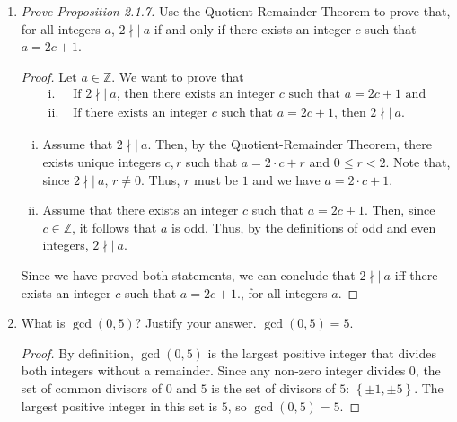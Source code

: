 \documentclass{article}
\begin{document}
\begin{enumerate}
    	\item \emph{Prove Proposition 2.1.7.} Use the Quotient-Remainder Theorem to prove that, for all integers $a$, $2\nmid|\ a$ if and only if there exists an integer $c$ such that $a = 2c + 1$.
                \begin{proof}
                    Let $a\in\mathbb{Z}$. We want to prove that 
                    \begin{align*}
                        \text{i. }   & \text{If $2\nmid|\ a$, then there exists an integer $c$ such that $a = 2c + 1$ and}  \\
                        \text{ii. }  & \text{If there exists an integer $c$ such that $a = 2c + 1$, then $2\nmid|\ a$.}
                    \end{align*}
                                
                    \begin{enumerate}[i.]
                        \item Assume that $2\nmid|\ a$. Then, by the Quotient-Remainder Theorem, there exists unique integers $c,r$ such that $a = 2\cdot c + r$ and $0 \le r < 2$. Note that, since $2\nmid|\ a$, $r \neq 0$. Thus, $r$ must be $1$ and we have $a = 2\cdot c + 1$. \\
                                    
                        \item Assume that there exists an integer $c$ such that $a = 2c + 1$. Then, since $c\in\mathbb{Z}$, it follows that $a$ is odd. Thus, by the definitions of odd and even integers, $2\nmid|\ a$. 
                    \end{enumerate}
                    Since we have proved both statements, we can conclude that $2\nmid|\ a$ iff there exists an integer $c$ such that $a = 2c + 1$., for all integers $a$.
                \end{proof}

    	\item What is $\gcd(0,5)$?  Justify your answer.
                $\gcd(0, 5) = 5$.
                \begin{proof}
                    By definition, $\gcd(0, 5)$ is the largest positive integer that divides both integers without a remainder. Since any non-zero integer divides $0$, the set of common divisors of $0$ and $5$ is the set of divisors of $5$: $\left\{ \pm1, \pm5 \right\}$. The largest positive integer in this set is $5$, so $\gcd(0, 5) = 5$.
                \end{proof}


\end{enumerate}
\end{document}
